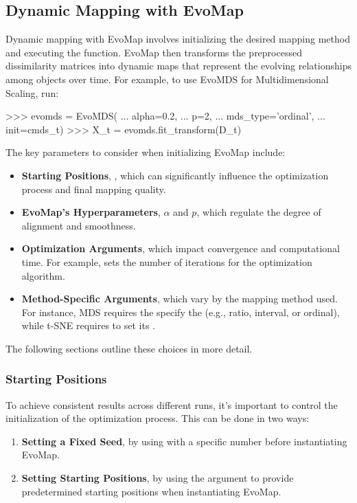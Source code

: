 \documentclass[article]{jss}
\begin{document}
\subsection{Dynamic Mapping with EvoMap}

Dynamic mapping with EvoMap involves initializing the desired mapping method and executing the  
function. EvoMap then transforms the preprocessed dissimilarity matrices into dynamic maps that represent the evolving 
relationships among objects over time. For example, to use EvoMDS for Multidimensional Scaling, run:

\begin{Code}
>>> evomds = EvoMDS(
...     alpha=0.2, 
...     p=2, 
...     mds_type='ordinal', 
...     init=cmds_t)                  
>>> X_t = evomds.fit_transform(D_t)    
\end{Code}

The key parameters to consider when initializing EvoMap include:
\begin{itemize}
  \item \textbf{Starting Positions}, , which can significantly influence the optimization process and final %
  mapping quality. 
  \item \textbf{EvoMap's Hyperparameters}, $\alpha$ and $p$, which regulate the degree of alignment and smoothness.
  \item \textbf{Optimization Arguments}, which impact convergence and computational time. For example,  %
  sets the number of iterations for the optimization algorithm.  
  \item \textbf{Method-Specific Arguments}, which vary by the mapping method used. For instance, MDS requires the specify the  %
  (e.g., ratio, interval, or ordinal), while t-SNE requires to set its . 
\end{itemize}

The following sections outline these choices in more detail. 

\subsubsection{Starting Positions}

To achieve consistent results across different runs, it's important to control the initialization of the optimization 
process. This can be done in two ways:

\begin{enumerate}
    \item \textbf{Setting a Fixed Seed}, by using  with a specific number before instantiating EvoMap.
    \item \textbf{Setting Starting Positions}, by using the  argument to provide predetermined starting positions when %
    instantiating EvoMap.
\end{enumerate}
\end{document}
